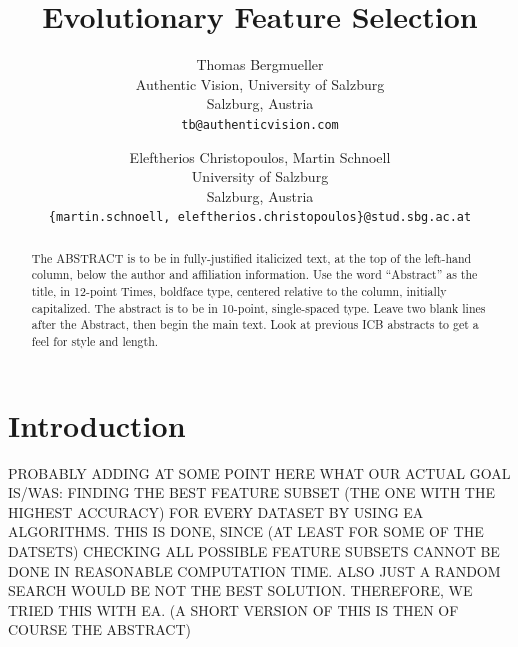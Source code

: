 \documentclass[11pt,onecolumn,a4paper]{report}
\begin{document}
\title{Evolutionary Feature Selection}

\author{Thomas Bergmueller\\
Authentic Vision, University of Salzburg\\
Salzburg, Austria\\
{\tt\small tb@authenticvision.com}
\and
Eleftherios Christopoulos, Martin Schnoell\\
University of Salzburg\\
Salzburg, Austria\\
{\tt\small \{martin.schnoell, eleftherios.christopoulos\}@stud.sbg.ac.at}
}



\maketitle
\thispagestyle{empty}
\newpage
\begin{abstract}
   The ABSTRACT is to be in fully-justified italicized text, at the top
   of the left-hand column, below the author and affiliation
   information. Use the word ``Abstract'' as the title, in 12-point
   Times, boldface type, centered relative to the column, initially
   capitalized. The abstract is to be in 10-point, single-spaced type.
   Leave two blank lines after the Abstract, then begin the main text.
   Look at previous ICB abstracts to get a feel for style and length.
\end{abstract}
\newpage
\section{Introduction}
\label{l}

PROBABLY ADDING AT SOME POINT HERE WHAT OUR ACTUAL GOAL IS/WAS: FINDING THE BEST FEATURE SUBSET (THE ONE WITH THE HIGHEST ACCURACY) FOR EVERY DATASET BY USING EA ALGORITHMS. THIS IS DONE, SINCE (AT LEAST FOR SOME OF THE DATSETS) CHECKING ALL POSSIBLE FEATURE SUBSETS CANNOT BE DONE IN REASONABLE COMPUTATION TIME. ALSO JUST A RANDOM SEARCH WOULD BE NOT THE BEST SOLUTION. THEREFORE, WE TRIED THIS WITH EA. (A SHORT VERSION OF THIS IS THEN OF COURSE THE ABSTRACT)
\end{document}
